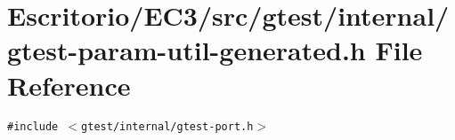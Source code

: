 \section{Escritorio/EC3/src/gtest/internal/gtest-param-util-generated.h File Reference}
\label{gtest-param-util-generated_8h}
{\tt \#include $<$gtest/internal/gtest-port.h$>$}\par
